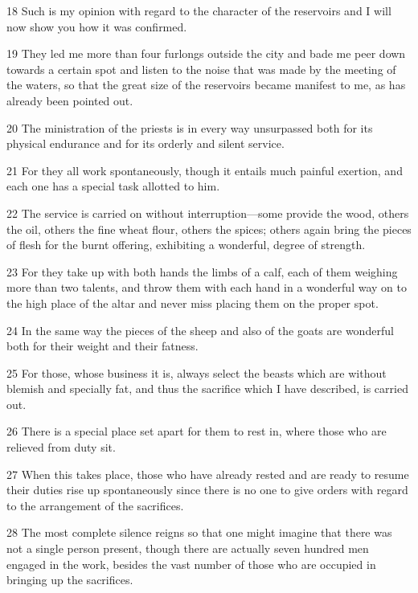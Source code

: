 \par 18 Such is my opinion with regard to the character of the reservoirs and I will now show you how it was confirmed.

\par 19 They led me more than four furlongs outside the city and bade me peer down towards a certain spot and listen to the noise that was made by the meeting of the waters, so that the great size of the reservoirs became manifest to me, as has already been pointed out.

\par 20 The ministration of the priests is in every way unsurpassed both for its physical endurance and for its orderly and silent service.

\par 21 For they all work spontaneously, though it entails much painful exertion, and each one has a special task allotted to him.

\par 22 The service is carried on without interruption—some provide the wood, others the oil, others the fine wheat flour, others the spices; others again bring the pieces of flesh for the burnt offering, exhibiting a wonderful, degree of strength.

\par 23 For they take up with both hands the limbs of a calf, each of them weighing more than two talents, and throw them with each hand in a wonderful way on to the high place of the altar and never miss placing them on the proper spot.

\par 24 In the same way the pieces of the sheep and also of the goats are wonderful both for their weight and their fatness.

\par 25 For those, whose business it is, always select the beasts which are without blemish and specially fat, and thus the sacrifice which I have described, is carried out.

\par 26 There is a special place set apart for them to rest in, where those who are relieved from duty sit.

\par 27 When this takes place, those who have already rested and are ready to resume their duties rise up spontaneously since there is no one to give orders with regard to the arrangement of the sacrifices.

\par 28 The most complete silence reigns so that one might imagine that there was not a single person present, though there are actually seven hundred men engaged in the work, besides the vast number of those who are occupied in bringing up the sacrifices.

